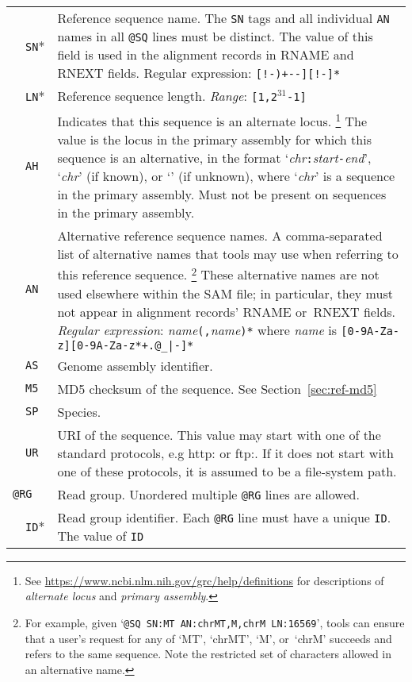 \documentclass[10pt]{article}
\begin{document}
\begin{center}
\begin{longtable}{|l|l|p{13.5cm}|}
  & {\tt SN}* & Reference sequence name.
The {\tt SN} tags and all individual {\tt AN} names in all {\tt @SQ} lines
must be distinct.
  The value of this field is used in the
  alignment records in {\sf RNAME} and {\sf RNEXT} fields. Regular expression: {\tt [!-)+-\char60\char62-\char126][!-\char126]*}\\\cline{2-3}
  & {\tt LN}* & Reference sequence length. \emph{Range}: {\tt [1,2$^{31}$-1]}\\\cline{2-3}
  & {\tt AH} & Indicates that this sequence is an alternate locus.%
\footnote{See \url{https://www.ncbi.nlm.nih.gov/grc/help/definitions} for descriptions of \emph{alternate locus} and \emph{primary assembly}.}
  The value is the locus in the primary assembly for which this sequence is an alternative, in the format `\emph{chr}{\tt :}\emph{start}{\tt -}\emph{end}', `\emph{chr}' (if known), or `{\tt *}' (if unknown), where `\emph{chr}' is a sequence in the primary assembly.
  Must not be present on sequences in the primary assembly.\\\cline{2-3}
  & {\tt AN} & Alternative reference sequence names.
A comma-separated list of alternative names that tools may use when referring
to this reference sequence.%
\footnote{For example, given `{\tt @SQ SN:MT AN:chrMT,M,chrM LN:16569}',
tools can ensure that a user's request for any of `MT', `chrMT', `M',
or~`chrM' succeeds and refers to the same sequence.
Note the restricted set of characters allowed in an alternative name.}
These alternative names are not used elsewhere within the SAM file;
in particular, they must not appear in alignment records' {\sf RNAME}
or~{\sf RNEXT} fields.
\emph{Regular expression}: \emph{name}{\tt (,}\emph{name}{\tt )*}
where \emph{name} is {\tt [0-9A-Za-z][0-9A-Za-z*+.@\_|-]*}\\\cline{2-3}
  & {\tt AS} & Genome assembly identifier. \\\cline{2-3}
  & {\tt M5} & MD5 checksum of the sequence.  See Section~\ref{sec:ref-md5}\\\cline{2-3}
  & {\tt SP} & Species.\\\cline{2-3}
  & {\tt UR} & URI of the sequence.  This value may start with one of the standard
  protocols, e.g http: or ftp:.  If it does not start with one of these protocols, it is assumed to be a file-system path.\\\cline{1-3}
  \multicolumn{2}{|l}{\tt @RG} & Read group. Unordered multiple {\tt @RG} lines are allowed.\\\cline{2-3}
  & {\tt ID}* & Read group identifier. Each {\tt @RG} line must have a unique {\tt ID}. The value of {\tt ID}

\end{longtable}
\end{center}
\end{document}
